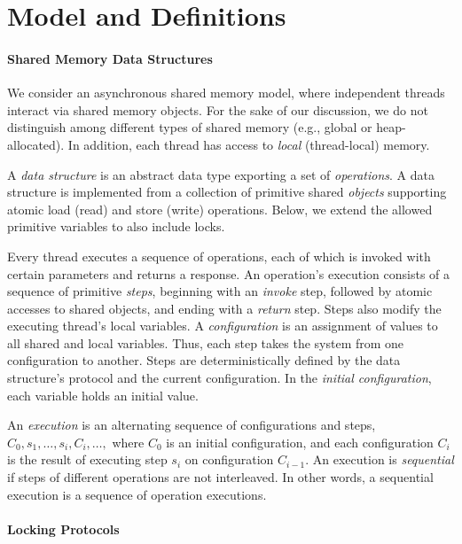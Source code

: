 \section{Model and Definitions}\label{sec:model}


\paragraph{Shared Memory Data Structures}

We consider an asynchronous shared memory model, where independent threads interact via shared memory objects.
For the sake of our discussion, we do not distinguish among different types of shared memory (e.g., global or heap-allocated). 
In addition, each thread has access to \emph{local} (thread-local) memory.

A \emph{data structure} is an abstract data type exporting a set of \emph{operations}.
A data structure is implemented from a collection of primitive shared \emph{objects} supporting atomic load (read) and store (write) operations.
Below, we extend the allowed primitive variables to also include locks. 

Every thread executes a sequence of operations, each of which is invoked with certain parameters and returns a response.
An operation's execution consists of a sequence of primitive \emph{steps}, beginning with an \emph{invoke} step, followed by 
atomic accesses to shared objects, and ending with a \emph{return} step. Steps also modify the executing thread's local variables.
A \emph{configuration} is an assignment of values to all shared and local variables. Thus, each step takes the system from one 
configuration to another. Steps are deterministically defined by the data structure's protocol and the current configuration. 
In the \emph{initial configuration}, each variable holds an initial value. 

An \emph{execution} is an alternating sequence of configurations and steps,
$C_0,s_1,\ldots,s_i,C_i,\ldots,$ 
where $C_0$ is an initial configuration,
and each configuration $C_i$ is the result of
executing step $s_i$ on configuration $C_{i-1}$.
An execution is \emph{sequential} if steps of different operations are not interleaved. 
In other words, a sequential execution is a sequence of operation executions.

\paragraph{Locking Protocols}

